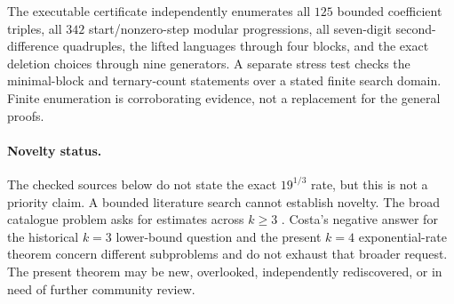 \documentclass[11pt]{article}
\theoremstyle{remark}
\begin{document}
The executable certificate independently enumerates all $125$ bounded
coefficient triples, all $342$ start/nonzero-step modular progressions, all
seven-digit second-difference quadruples, the lifted languages through four
blocks, and the exact deletion choices through nine generators.  A separate
stress test checks the minimal-block and ternary-count statements over a stated
finite search domain.  Finite enumeration is corroborating evidence, not a
replacement for the general proofs.

\paragraph{Novelty status.}
The checked sources below do not state the exact $19^{1/3}$ rate, but this is
not a priority claim.  A bounded literature search cannot establish novelty.
The broad catalogue problem asks for estimates across $k\ge3$
\cite{Bloom817}.  Costa's negative answer for the historical $k=3$ lower-bound
question and the present $k=4$ exponential-rate theorem concern different
subproblems and do not exhaust that broader request.  The present theorem may
be new, overlooked, independently rediscovered, or in need of further
community review.

\begingroup
\small


\endgroup
\end{document}
